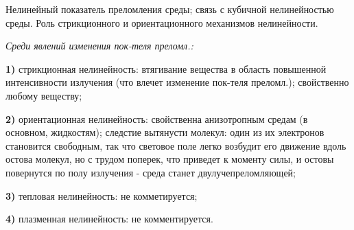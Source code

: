 
\begin{leftrules}
Нелинейный показатель преломления среды; связь с кубичной нелинейностью среды. Роль стрикционного и ориентационного механизмов нелинейности.
\end{leftrules}




\textit{Среди явлений изменения пок-теля преломл.:} \\
    \par \textbf{1)} стрикционная нелинейность: втягивание вещества в область повышенной интенсивности излучения (что влечет изменение пок-теля преломл.); свойственно любому веществу; \\
    \par \textbf{2)} ориентационная нелинейность: свойственна анизотропным средам (в основном, жидкостям); следстие вытянусти молекул: один из их электронов становится свободным, так что световое поле легко возбудит его движение вдоль остова молекул, но с трудом поперек, что приведет к моменту силы, и остовы повернутся по полу излучения - среда станет двулучепреломляющей; \\
    \par \textbf{3)} тепловая нелинейность: не комметируется; \\
    \par \textbf{4)} плазменная нелинейность: не комментируется.



